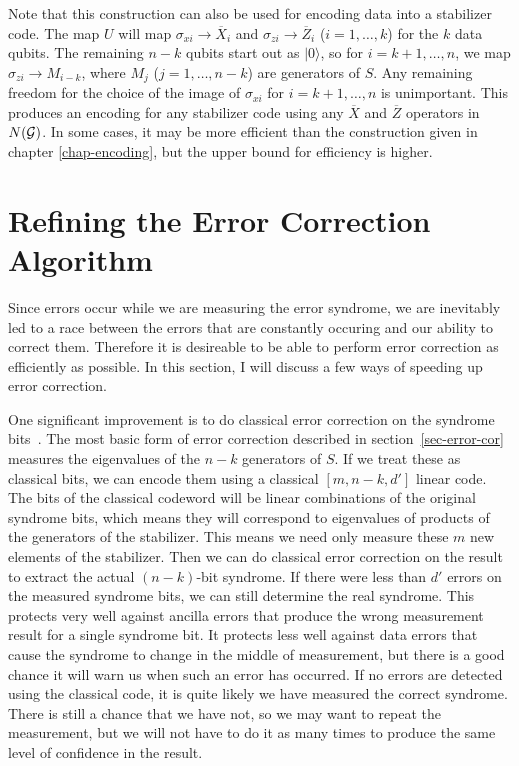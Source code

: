 \documentclass{report}
\newcommand{\G}{{\cal G}}
\newcommand{\ket}[1]{|{#1}\rangle}
\newcommand{\Xs}[1]{\sigma_{x{#1}}}
\newcommand{\Zs}[1]{\sigma_{z{#1}}}
\newcommand{\Xbar}{\overline{X}}
\newcommand{\Zbar}{\overline{Z}}
\begin{document}
Note that this construction can also be used for encoding data into a 
stabilizer code.  The map $U$ will map $\Xs{i} \rightarrow \Xbar_i$ and 
$\Zs{i} \rightarrow \Zbar_i$ ($i = 1, \ldots, k$) for the $k$ data qubits.  The 
remaining $n-k$ qubits start out as $\ket{0}$, so for $i=k+1, \ldots, n$, we 
map $\Zs{i} \rightarrow M_{i-k}$, where $M_j$ ($j = 1, \ldots, n-k$) are 
generators of $S$.  Any remaining freedom for the choice of the image of 
$\Xs{i}$ for $i = k+1, \ldots, n$ is unimportant.  This produces an encoding 
for any stabilizer code using any $\Xbar$ and $\Zbar$ operators in 
$N(\G)$.  In some cases, it may be more efficient than the construction 
given in chapter \ref{chap-encoding}, but the upper bound for efficiency is 
higher.

\section{Refining the Error Correction Algorithm}

Since errors occur while we are measuring the error syndrome, we are 
inevitably led to a race between the errors that are constantly occuring 
and our ability to correct them.  Therefore it is desireable to be able to 
perform error correction as efficiently as possible.  In this section, I will 
discuss a few ways of speeding up error correction.

One significant improvement is to do classical error correction on the 
syndrome bits~\cite{evslin}.  The most basic form of error correction 
described in section~\ref{sec-error-cor} measures the eigenvalues of the 
$n-k$ generators of $S$.  If we treat these as classical bits, we can encode 
them using a classical $[m, n-k, d']$ linear code.  The bits of the classical 
codeword will be linear combinations of the original syndrome bits, which 
means they will correspond to eigenvalues of products of the generators of 
the stabilizer.  This means we need only measure these $m$ new elements 
of the stabilizer.  Then we can do classical error correction on the result to 
extract the actual $(n-k)$-bit syndrome.  If there were less than $d'$ 
errors on the measured syndrome bits, we can still determine the real 
syndrome.  This protects very well against ancilla errors that produce the 
wrong measurement result for a single syndrome bit.  It protects less well 
against data errors that cause the syndrome to change in the middle of 
measurement, but there is a good chance it will warn us when such an 
error has occurred.  If no errors are detected using the classical code, it is 
quite likely we have measured the correct syndrome.  There is still a 
chance that we have not, so we may want to repeat the measurement, but 
we will not have to do it as many times to produce the same level of 
confidence in the result.
\end{document}
